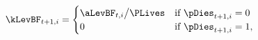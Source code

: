 \begin{equation*}  
\kLevBF_{t+1,i}  =
\begin{cases}
    \aLevBF_{t,i} \big/\PLives & \text{if } \pDies_{t+1,i} = 0 \\
     0                       & \text{if } \pDies_{t+1,i} = 1,
\end{cases} \label{eq:tontine}
\end{equation*}
